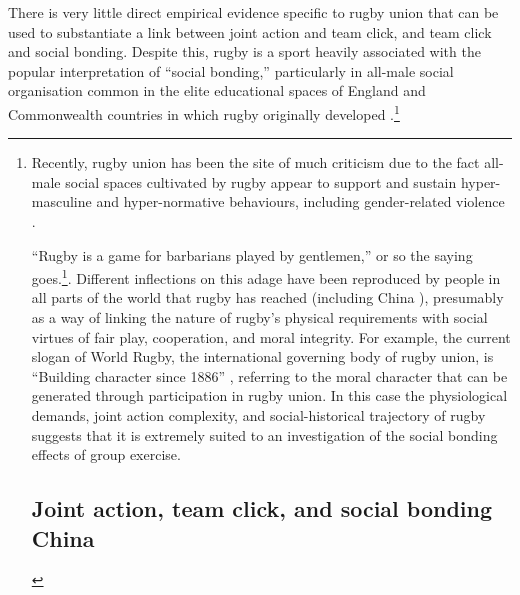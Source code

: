 There is very little direct empirical evidence specific to rugby union that can be used to substantiate a link between joint action and team click, and team click and social bonding.  Despite this, rugby is a sport heavily associated with the popular interpretation of ``social bonding,'' particularly in all-male social organisation common in the elite educational spaces of England and Commonwealth countries in which rugby originally developed \citep{Dunning2005,Richards2007,Collins2008}.\footnote{Recently, rugby union has been the site of much criticism due to the fact all-male social spaces cultivated by rugby appear to support and sustain hyper-masculine and hyper-normative behaviours, including gender-related violence \citep{Cosslett2014}.

``Rugby is a game for barbarians played by gentlemen,'' or so the saying goes.\footnote{The origins of this oft-cited Rugby adage is unclear.  The phrase is supposedly the adopted motto of the British Barbarians Football Club, established in 1890 \citep[34]{Dunning2005}.  The complete phrase reads ``Rugby is a game for barbarians played by gentlemen, football is a game for gentlemen played by barbarians.''  However, official club history cites its original motto as, ‘Rugby Football is a game for gentlemen in all classes, but for no bad sportsman in any class' \citep[vii]{Starmer-Smith1977}.  Some sources attribute the saying to British writer and poet Oscar Wilde (1854-1900) \citep{Fleenor2015}}. Different inflections on this adage have been reproduced by people in all parts of the world that rugby has reached (including China \cite{}), presumably as a way of linking the nature of rugby's physical requirements with social virtues of fair play, cooperation, and moral integrity. For example, the current slogan of World Rugby, the international governing body of rugby union, is ``Building character since 1886'' \citep{WorldRugby2017}, referring to the moral character that can be generated through participation in rugby union.  In this case the physiological demands, joint action complexity, and social-historical trajectory of rugby suggests that it is extremely suited to an investigation of the social bonding effects of group exercise.



  \subsection{Joint action, team click, and social bonding China}

}
